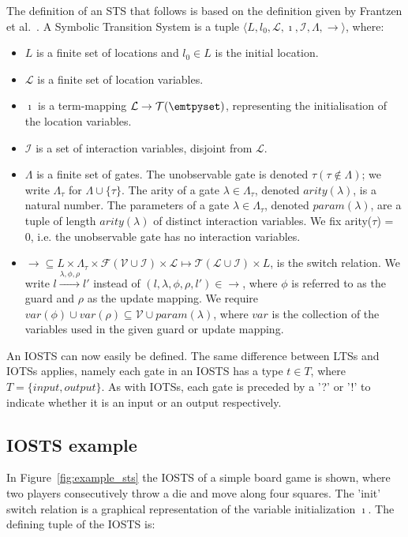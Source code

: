 \begin{definition}
The definition of an STS that follows is based on the definition given by Frantzen et al.~\cite{Frantzen:Symbolic}. A Symbolic Transition System is a tuple $\langle L,l_0,\mathcal{L},\imath,\mathcal{I},\Lambda,\rightarrow\rangle$, where:
\begin{itemize}
\item $L$ is a finite set of locations and $l_0 \in L$ is the initial location.
\item $\mathcal{L}$ is a finite set of location variables.
\item $\imath$ is a term-mapping $\mathcal{L} \rightarrow \mathcal{T}(\emtpyset)$, representing the initialisation of the location variables.
\item $\mathcal{I}$ is a set of interaction variables, disjoint from $\mathcal{L}$.
\item $\Lambda$ is a finite set of gates. The unobservable gate is denoted $\tau (\tau \notin \Lambda)$; we write $\Lambda_\tau$ for $\Lambda \cup \{\tau\}$. The arity of a gate $\lambda\in\Lambda_\tau$, denoted $arity(\lambda)$, is a natural number. The parameters of a gate $\lambda\in\Lambda_\tau$, denoted $param(\lambda)$, are a tuple of length $arity(\lambda)$ of distinct interaction variables. We fix arity($\tau$) = 0, i.e. the unobservable gate has no interaction variables.
\item $\rightarrow \subseteq L \times \Lambda_\tau \times \mathcal{F}(\mathcal{V} \cup \mathcal{I}) \times \mathcal{L} \mapsto \mathcal{T}(\mathcal{L} \cup \mathcal{I}) \times L$, is the switch relation. We write $l\xrightarrow{\lambda,\phi,\rho}l'$ instead of $(l,\lambda,\phi,\rho,l')\in\rightarrow$, where $\phi$ is referred to as the guard and $\rho$ as the update mapping. We require $var(\phi) \cup var(\rho) \subseteq \mathcal{V} \cup param(\lambda)$, where $var$ is the collection of the variables used in the given guard or update mapping.
\end{itemize}
\end{definition}

An IOSTS can now easily be defined. The same difference between LTSs and IOTSs applies, namely each gate in an IOSTS has a type $t \in T$, where $T = \{input, output\}$. As with IOTSs, each gate is preceded by a '?' or '!' to indicate whether it is an input or an output respectively.

\subsection{IOSTS example}\label{sec:sts_example}
In Figure~\ref{fig:example_sts} the IOSTS of a simple board game is shown, where two players consecutively throw a die and move along four squares. The 'init' switch relation is a graphical representation of the variable initialization $\imath$. The defining tuple of the IOSTS is:

